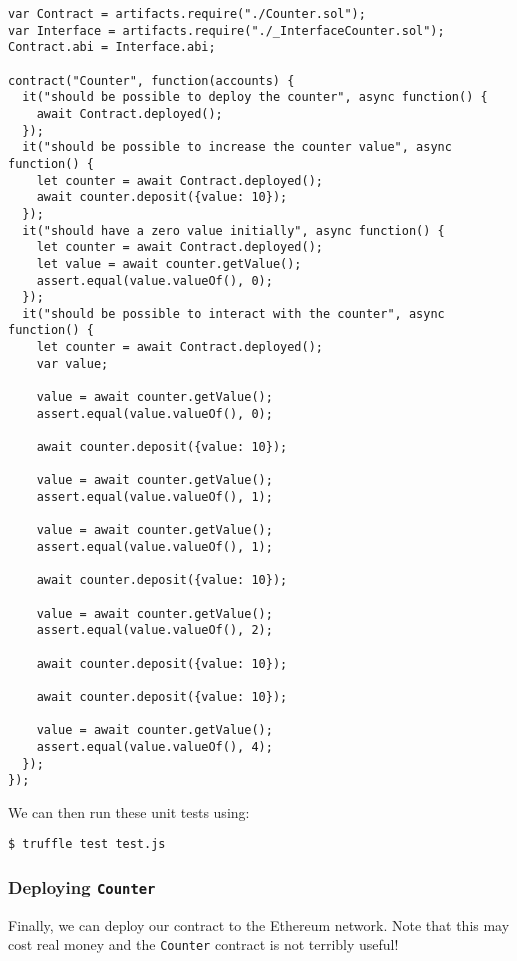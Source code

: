 \begin{verbatim}
var Contract = artifacts.require("./Counter.sol");
var Interface = artifacts.require("./_InterfaceCounter.sol");
Contract.abi = Interface.abi;

contract("Counter", function(accounts) {
  it("should be possible to deploy the counter", async function() {
    await Contract.deployed();
  });
  it("should be possible to increase the counter value", async function() {
    let counter = await Contract.deployed();
    await counter.deposit({value: 10});
  });
  it("should have a zero value initially", async function() {
    let counter = await Contract.deployed();
    let value = await counter.getValue();
    assert.equal(value.valueOf(), 0);
  });
  it("should be possible to interact with the counter", async function() {
    let counter = await Contract.deployed();
    var value;

    value = await counter.getValue();
    assert.equal(value.valueOf(), 0);

    await counter.deposit({value: 10});

    value = await counter.getValue();
    assert.equal(value.valueOf(), 1);

    value = await counter.getValue();
    assert.equal(value.valueOf(), 1);

    await counter.deposit({value: 10});

    value = await counter.getValue();
    assert.equal(value.valueOf(), 2);

    await counter.deposit({value: 10});

    await counter.deposit({value: 10});

    value = await counter.getValue();
    assert.equal(value.valueOf(), 4);
  });
});
\end{verbatim}

We can then run these unit tests using:

\begin{verbatim}
$ truffle test test.js
\end{verbatim}

\subsubsection{Deploying \texttt{Counter}}
\label{sec:appendix-b-deploying-counter}

Finally, we can deploy our contract to the Ethereum network. Note that this may cost real money and the \texttt{Counter} contract is not terribly useful!

